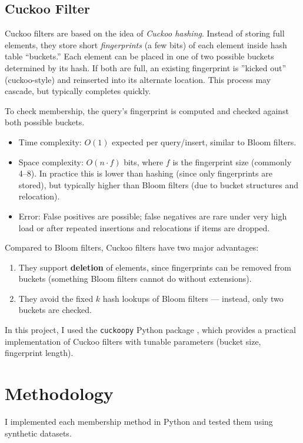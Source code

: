 \documentclass[acmsmall]{acmart}
\begin{document}
\subsection{Cuckoo Filter}
Cuckoo filters are based on the idea of \emph{Cuckoo hashing}. Instead of storing full elements, they store short \emph{fingerprints} (a few bits) of each element inside hash table ``buckets.'' Each element can be placed in one of two possible buckets determined by its hash. If both are full, an existing fingerprint is ''kicked out'' (cuckoo-style) and reinserted into its alternate location. This process may cascade, 
but typically completes quickly.

To check membership, the query’s fingerprint is computed and checked against both possible buckets.  

\begin{itemize}
  \item Time complexity: $O(1)$ expected per query/insert, similar to Bloom filters.  
  \item Space complexity: $O(n \cdot f)$ bits, where $f$ is the fingerprint size (commonly 4–8). In practice this is lower than hashing (since only fingerprints are stored), but typically higher than Bloom filters (due to bucket structures and relocation).  
  \item Error: False positives are possible; false negatives are rare under very high load or after repeated insertions and relocations if items are dropped.  
\end{itemize}

Compared to Bloom filters, Cuckoo filters have two major advantages:
\begin{enumerate}
  \item They support \textbf{deletion} of elements, since fingerprints can be removed from buckets (something Bloom filters cannot do without extensions).  
  \item They avoid the fixed $k$ hash lookups of Bloom filters — instead, only two buckets are checked.  
\end{enumerate}

In this project, I used the \texttt{cuckoopy} Python package \cite{cuckoopy}, which provides a practical implementation of Cuckoo filters with tunable parameters (bucket size, fingerprint length).  

\section{Methodology}
I implemented each membership method in Python and tested them using synthetic datasets.  
\end{document}

